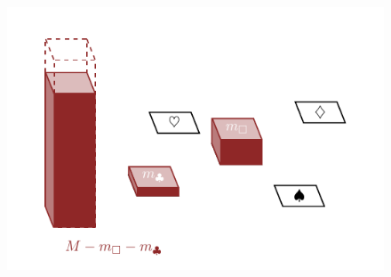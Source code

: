 \documentclass[
  letterpaper,
  DIV=11,
  numbers=noendperiod]{scrartcl}
\begin{document}
\begin{figure}
\begin{minipage}[t]{0.50\linewidth}
{{\includegraphics{figures/allocations/2/2.pdf}

}

}

\subcaption{\label{fig-allocationb}}
\end{minipage}%
\newline
\begin{minipage}[t]{0.50\linewidth}

{\centering 


}

\subcaption{\label{fig-allocationc}}
\end{minipage}%
%
\begin{minipage}[t]{0.50\linewidth}


\end{minipage}
\end{figure}
\end{document}

